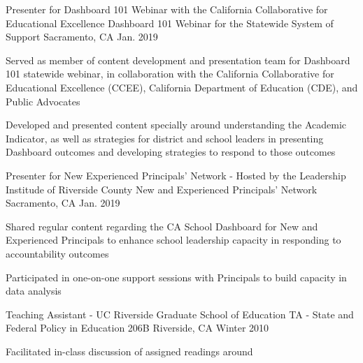 \begin{cventries}
  \cventry
    {Presenter for Dashboard 101 Webinar with the California Collaborative for Educational Excellence} %
    {Dashboard 101 Webinar for the Statewide System of Support} %
    {Sacramento, CA} %
    {Jan. 2019} %
    {
      \begin{cvitems} %
        \item {Served as member of content development and presentation team for Dashboard 101 statewide webinar, in collaboration with the California Collaborative for Educational Excellence (CCEE), California Department of Education (CDE), and Public Advocates}
        \item {Developed and presented content specially around understanding the Academic Indicator, as well as strategies for district and school leaders in presenting Dashboard outcomes and developing strategies to respond to those outcomes}
      \end{cvitems}
    }


  \cventry
    {Presenter for New Experienced Principals' Network - Hosted by the Leadership Institude of Riverside County} %
    {New and Experienced Principals' Network} %
    {Sacramento, CA} %
    {Jan. 2019} %
    {
      \begin{cvitems} %
        \item {Shared regular content regarding the CA School Dashboard for New and Experienced Principals to enhance school leadership capacity in responding to accountability outcomes}
        \item {Participated in one-on-one support sessions with Principals to build capacity in data analysis}
      \end{cvitems}
    }

  \cventry
    {Teaching Assistant - UC Riverside Graduate School of Education} %
    {TA - State and Federal Policy in Education 206B} %
    {Riverside, CA} %
    {Winter 2010} %
    {
      \begin{cvitems} %
        \item {Facilitated in-class discussion of assigned readings around }
      \end{cvitems}
    }


\end{cventries}
